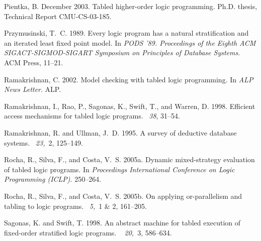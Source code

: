 \documentclass{tlp}
\begin{document}
\begin{thebibliography}{}
{\sc Pientka, B.} December 2003.
\newblock Tabled higher-order logic programming.
\newblock Ph.D. thesis, Technical Report CMU-CS-03-185.

{\sc Przymusinski, T.~C.} 1989.
\newblock Every logic program has a natural stratification and an iterated
  least fixed point model.
\newblock In {\em {PODS} '89. Proceedings of the Eighth {ACM}
  {SIGACT-SIGMOD-SIGART} Symposium on Principles of Database Systems}. ACM
  Press, 11--21.

{\sc Ramakrishnan, C.} 2002.
\newblock Model checking with tabled logic programming.
\newblock In {\em ALP News Letter}. ALP.

{\sc Ramakrishnan, I.}, {\sc Rao, P.}, {\sc Sagonas, K.}, {\sc Swift, T.}, {\sc
  and} {\sc Warren, D.} 1998.
\newblock Efficient access mechanisms for tabled logic programs.
~{\em 38}, 31--54.

{\sc Ramakrishnan, R.} {\sc and} {\sc Ullman, J.~D.} 1995.
\newblock A survey of deductive database systems.
~{\em 23,\/}~2, 125--149.

{\sc Rocha, R.}, {\sc Silva, F.}, {\sc and} {\sc Costa, V.~S.} 2005a.
\newblock Dynamic mixed-strategy evaluation of tabled logic programs.
\newblock In {\em Proceedings International Conference on Logic Programming
  (ICLP)}. 250--264.

{\sc Rocha, R.}, {\sc Silva, F.}, {\sc and} {\sc Costa, V.~S.} 2005b.
\newblock On applying or-parallelism and tabling to logic programs.
~{\em 5,\/}~1
  \& 2, 161--205.

{\sc Sagonas, K.} {\sc and} {\sc Swift, T.} 1998.
\newblock An abstract machine for tabled execution of fixed-order stratified
  logic programs.
~{\em
  20,\/}~3, 586--634.


\end{thebibliography}
\end{document}
